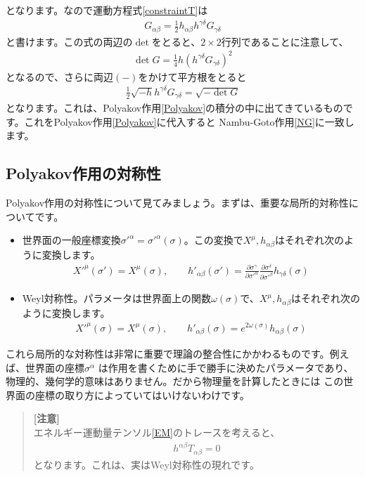 \documentclass[report,paper=a4, fontsize=12pt, line_length=16cm, number_of_lines=34,dvipdfmx]{jlreq}
\numberwithin{equation}{chapter}
\numberwithin{equation}{section}
\newcommand{\del}{\partial}
\newenvironment{remark}{\begin{quote}\small\textbf{[注意]}\\ }{\end{quote}}
\begin{document}
となります。なので運動方程式\eqref{constraintT}は
\begin{align}
G_{\alpha\beta}=\frac12 h_{\alpha\beta}h^{\gamma\delta}G_{\gamma\delta}
\end{align}
と書けます。この式の両辺の$\det$をとると、$2\times 2$行列であることに注意して、
\begin{align}
\det G=\frac14 h (h^{\gamma\delta}G_{\gamma\delta})^2
\end{align}
となるので、さらに両辺$(-)$をかけて平方根をとると
\begin{align}
\frac12 \sqrt{-h}h^{\gamma\delta}G_{\gamma\delta}=\sqrt{-\det G}
\end{align}
となります。これは、Polyakov作用\eqref{Polyakov}の積分の中に出てきているものです。これをPolyakov作用\eqref{Polyakov}に代入すると
Nambu-Goto作用\eqref{NG}に一致します。
\subsection{Polyakov作用の対称性}
Polyakov作用の対称性について見てみましょう。まずは、重要な局所的対称性についてです。
\begin{itemize}
\item 世界面の一般座標変換$\sigma'^{\alpha}=\sigma'^{\alpha}(\sigma)$。この変換で$X^{\mu},h_{\alpha\beta}$はそれぞれ次のように変換します。
\begin{align}
X'^\mu(\sigma')=X^{\mu}(\sigma),\qquad
h'_{\alpha\beta}(\sigma') = 
\frac{\del \sigma^{\gamma}}{\del \sigma'^{\alpha}}
\frac{\del \sigma^{\delta}}{\del \sigma'^{\beta}}
h_{\gamma\delta}(\sigma)
\end{align}
\item Weyl対称性。パラメータは世界面上の関数$\omega(\sigma)$で、$X^{\mu},h_{\alpha\beta}$はそれぞれ次のように変換します。
\begin{align}
X'^\mu(\sigma)=X^{\mu}(\sigma),\qquad
h'_{\alpha\beta}(\sigma) =
e^{2\omega(\sigma)}
h_{\alpha\beta}(\sigma)
\end{align}
\end{itemize}
これら局所的な対称性は非常に重要で理論の整合性にかかわるものです。例えば、世界面の座標$\sigma^{\alpha}$
は作用を書くために手で勝手に決めたパラメータであり、物理的、幾何学的意味はありません。だから物理量を計算したときには
この世界面の座標の取り方によっていてはいけないわけです。
\begin{remark}
エネルギー運動量テンソル\eqref{EM}のトレースを考えると、
\begin{align}
h^{\alpha\beta}T_{\alpha\beta}=0
\end{align}
となります。これは、実はWeyl対称性の現れです。
\end{remark}
\end{document}
